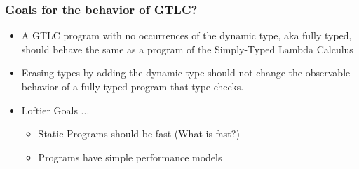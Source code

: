 \documentclass{beamer}
\begin{document}


\frame
{
  \frametitle{Goals for the behavior of GTLC?}
  \begin{itemize}
  \item A GTLC program with no occurrences of the dynamic type, aka fully typed, 			should behave the same as a program of the Simply-Typed Lambda Calculus
  \item Erasing types by adding the dynamic type should not change the observable 
        behavior of a fully typed program that type checks.
  \item Loftier Goals ...
 	\begin{itemize}
	\item Static Programs should be fast (What is fast?)
	\item Programs have simple performance models
	\end{itemize}
  \end{itemize}
}


\end{document}
